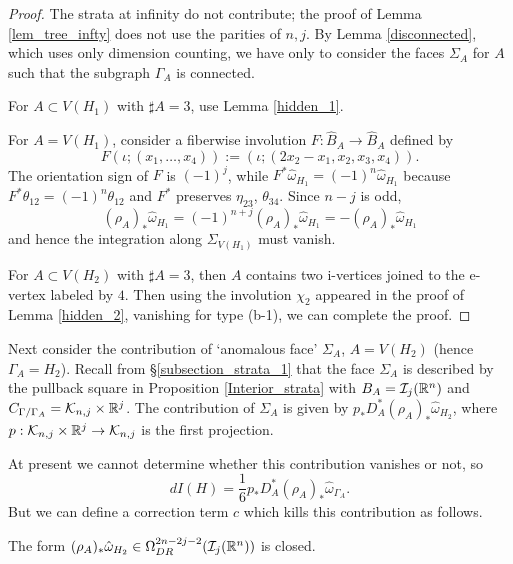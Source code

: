 \begin{proof}
The strata at infinity do not contribute; the proof of Lemma \ref{lem_tree_infty} does not use the parities of $n,j$.
By Lemma \ref{disconnected}, which uses only dimension counting, we have only to consider the faces $\Sigma_A$ for $A$
such that the subgraph $\Gamma_A$ is connected.

For $A \subset V(H_1 )$ with $\sharp A =3$, use Lemma \ref{hidden_1}.

For $A=V(H_1 )$, consider a fiberwise involution $F:\hat{B}_A \to \hat{B}_A$ defined by
\[
 F(\iota ; (x_1 ,\dots ,x_4 )) := (\iota ; (2x_2 -x_1 ,x_2,x_3 ,x_4)).
\]
The orientation sign of $F$ is $(-1)^j$, while $F^* \hat{\omega}_{H_1}=(-1)^n \hat{\omega}_{H_1}$ because
$F^* \theta_{12} = (-1)^n \theta_{12}$ and $F^*$ preserves $\eta_{23}$, $\theta_{34}$.
Since $n-j$ is odd,
\[
 (\rho_A )_* \hat{\omega}_{H_1} =(-1)^{n+j}(\rho_A )_* \hat{\omega}_{H_1} = -(\rho_A )_* \hat{\omega}_{H_1}
\]
and hence the integration along $\Sigma_{V(H_1)}$ must vanish.

For $A \subset V(H_2 )$ with $\sharp A=3$, then $A$ contains two i-vertices joined to the e-vertex labeled by $4$.
Then using the involution $\chi_2$ appeared in the proof of Lemma \ref{hidden_2}, vanishing for type (b-1),
we can complete the proof.
\end{proof}


Next consider the contribution of `anomalous face' $\Sigma_A$, $A=V(H_2 )$ (hence $\Gamma_A =H_2$).
Recall from \S \ref{subsection_strata_1} that the face $\Sigma_A$ is described by the pullback square in Proposition
\ref{Interior_strata} with $B_A =\mathcal{I}_j (\mathbb{R}^n )$ and $C_{\Gamma / \Gamma_A}=\mathcal{K}_{n ,j}\times \mathbb{R}^j$.
The contribution of $\Sigma_A$ is given by $p_* D^*_A (\rho_A )_* \hat{\omega}_{H_2}$, where
$p:\mathcal{K}_{n ,j} \times \mathbb{R}^j \to \mathcal{K}_{n ,j}$ is the first projection.


At present we cannot determine whether this contribution vanishes or not, so
\[
 dI(H) = \frac{1}{6}p_* D^*_A (\rho_A )_* \hat{\omega}_{\Gamma_A}.
\]
But we can define a correction term $c$ which kills this contribution as follows.


\begin{lem}\label{lem_hatomega_closed}
The form $(\rho_A )_* \hat{\omega}_{H_2} \in \Omega^{2n-2j-2}_{DR}(\mathcal{I}_j (\mathbb{R}^n ))$ is closed.
\end{lem}


